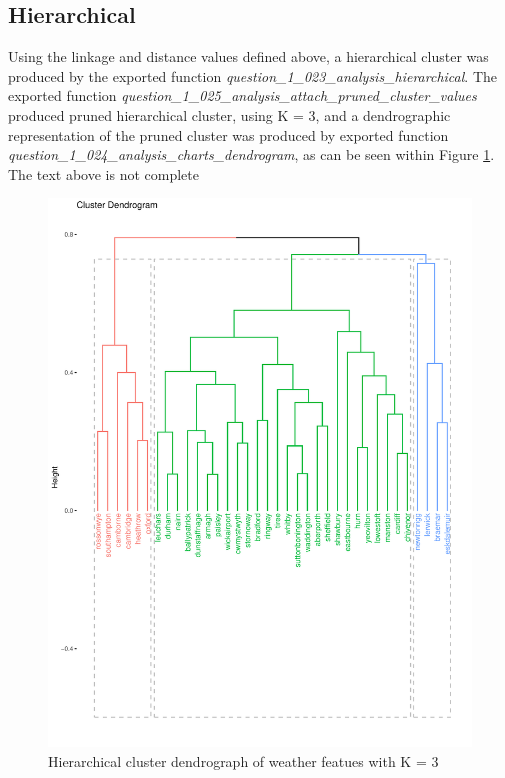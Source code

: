 \documentclass[12pt, oneside, openany]{book}
\begin{document}
\subsection*{Hierarchical}
Using the linkage and distance values defined above, a hierarchical cluster was produced by the exported function \emph{question\_1\_023\_analysis\_hierarchical}. The exported function \emph{question\_1\_025\_analysis\_attach\_pruned\_cluster\_values} produced pruned hierarchical cluster, using K = 3, and a dendrographic representation of the pruned cluster was produced by exported function \emph{question\_1\_024\_analysis\_charts\_dendrogram}, as can be seen within Figure \ref{fig:question_1_024_analysis_charts_dendrogram}. 
\color{red}The text above is not complete\color{black}

\begin{figure}
	\centering
	\captionsetup{justification=centering}
	\includegraphics[scale=0.7]{question_1_024_analysis_charts_dendrogram}
	\caption{Hierarchical cluster dendrograph of weather featues with K = 3}
	\label{fig:question_1_024_analysis_charts_dendrogram}
\end{figure}
\end{document}
